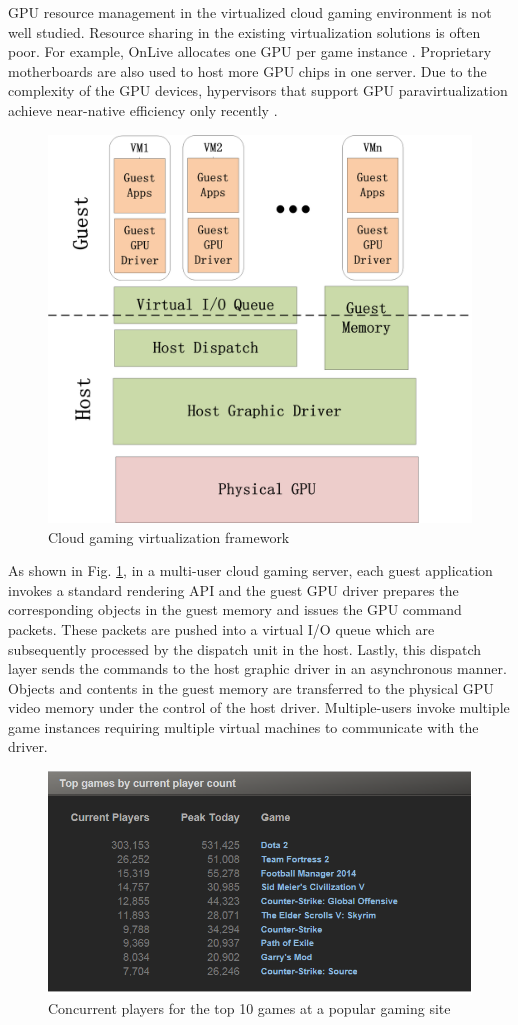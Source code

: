 \documentclass[pageno]{jpaper}
\begin{document}
GPU resource management in the virtualized cloud gaming
environment is not well studied. Resource sharing in the existing
virtualization solutions is often poor. For example, OnLive allocates one GPU
per game instance \cite{OnLive}. Proprietary motherboards
are also used to host more GPU chips in one server. Due to the complexity of the GPU devices, hypervisors that support GPU paravirtualization
achieve near-native efficiency only recently \cite{nvgrid} \cite{vm}.

 \begin{figure}
\centering
\includegraphics[width=3.4 in]{pics/vm.png}
\caption{Cloud gaming virtualization framework}
\label{fig:vm}
\end{figure}

As shown in Fig. \ref{fig:vm}, in a multi-user cloud gaming server, each guest
application invokes a standard rendering API and the
guest GPU driver prepares the corresponding objects in the guest memory
and issues the GPU command packets. These packets are
pushed into a virtual I/O queue which are subsequently
processed by the dispatch unit in the host. Lastly, this
dispatch layer sends the commands to the host graphic driver in an
asynchronous manner. Objects and contents in the guest memory
are transferred to the physical GPU video memory under the control of the host driver. Multiple-users invoke multiple game instances requiring multiple virtual machines to communicate with the driver.


  \begin{figure}
\centering
\includegraphics[width=3.5 in]{pics/topgame.png}
\caption{Concurrent players for the top 10 games at a popular gaming site}
\label{fig:topgame}
\end{figure}
\end{document}
